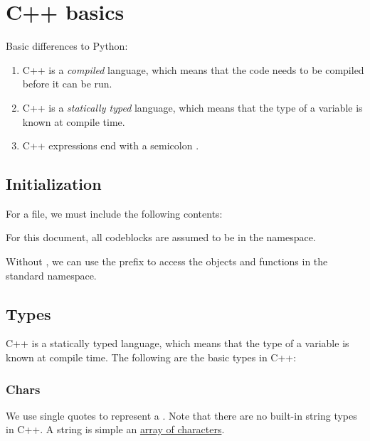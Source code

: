 \documentclass{article}
\begin{document}



\newpage
\tableofcontents
\newpage

\section{C++ basics}
Basic differences to Python:
\begin{enumerate}
    \item C++ is a \emph{compiled} language, which means that the code needs to be compiled before it can be run.
    \item C++ is a \emph{statically typed} language, which means that the type of a variable is known at compile time.
    \item C++ expressions end with a semicolon .
\end{enumerate}
\subsection{Initialization}
For a  file, we must include the following contents:

For this document, all codeblocks are assumed to be in the  namespace.

Without , we can use the  prefix to access the objects and functions in the standard namespace.

\subsection{Types}
C++ is a statically typed language, which means that the type of a variable is known at compile time. The following are the basic types in C++:

\subsubsection{Chars}
We use single quotes to represent a .
Note that there are no built-in string types in C++. A string is simple an \hyperref[sec:array]{array of characters}.
\end{document}
